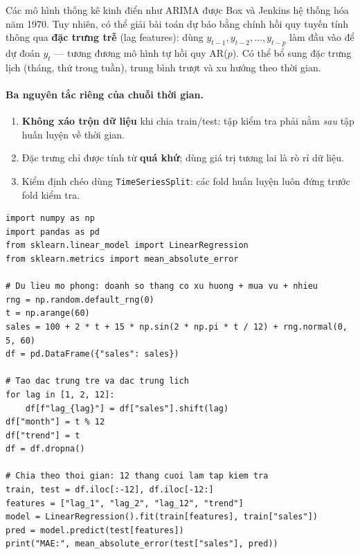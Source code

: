 Các mô hình thống kê kinh điển như ARIMA được Box và Jenkins hệ thống hóa năm 1970. Tuy nhiên, có thể giải bài toán dự báo bằng chính hồi quy tuyến tính thông qua \textbf{đặc trưng trễ} (lag features): dùng $y_{t-1}, y_{t-2}, \dots, y_{t-p}$ làm đầu vào để dự đoán $y_t$ --- tương đương mô hình tự hồi quy AR($p$). Có thể bổ sung đặc trưng lịch (tháng, thứ trong tuần), trung bình trượt và xu hướng theo thời gian.

\paragraph{Ba nguyên tắc riêng của chuỗi thời gian.}
\begin{enumerate}
    \item \textbf{Không xáo trộn dữ liệu} khi chia train/test: tập kiểm tra phải nằm \textit{sau} tập huấn luyện về thời gian.
    \item Đặc trưng chỉ được tính từ \textbf{quá khứ}; dùng giá trị tương lai là rò rỉ dữ liệu.
    \item Kiểm định chéo dùng \texttt{TimeSeriesSplit}: các fold huấn luyện luôn đứng trước fold kiểm tra.
\end{enumerate}

\begin{lstlisting}[caption={Dự báo chuỗi thời gian bằng đặc trưng trễ}]
import numpy as np
import pandas as pd
from sklearn.linear_model import LinearRegression
from sklearn.metrics import mean_absolute_error

# Du lieu mo phong: doanh so thang co xu huong + mua vu + nhieu
rng = np.random.default_rng(0)
t = np.arange(60)
sales = 100 + 2 * t + 15 * np.sin(2 * np.pi * t / 12) + rng.normal(0, 5, 60)
df = pd.DataFrame({"sales": sales})

# Tao dac trung tre va dac trung lich
for lag in [1, 2, 12]:
    df[f"lag_{lag}"] = df["sales"].shift(lag)
df["month"] = t % 12
df["trend"] = t
df = df.dropna()

# Chia theo thoi gian: 12 thang cuoi lam tap kiem tra
train, test = df.iloc[:-12], df.iloc[-12:]
features = ["lag_1", "lag_2", "lag_12", "trend"]
model = LinearRegression().fit(train[features], train["sales"])
pred = model.predict(test[features])
print("MAE:", mean_absolute_error(test["sales"], pred))
\end{lstlisting}


